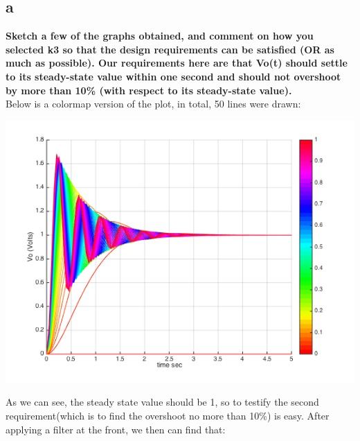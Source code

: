 \documentclass[11pt]{scrartcl}
\begin{document}
\subsection*{a}
\textbf{ Sketch a few of the graphs obtained, and comment on how you selected k3 so that the design requirements can be satisfied (OR as much as possible). Our requirements here are that Vo(t) should settle to its steady-state value within one second and should not overshoot by more than 10\% (with respect to its steady-state value).}\\


Below is a colormap version of the plot, in total, 50 lines were drawn:\\
\begin{minipage}[t]{\linewidth}

{
\includegraphics[scale = 0.7]{main.png}
\label{fig:main}
}
\end{minipage}
\medskip

As we can see, the steady state value should be 1, so to testify the second requirement(which is to find the overshoot no more than 10\%) is easy. After applying a filter at the front, we then can find that:
\end{document}
